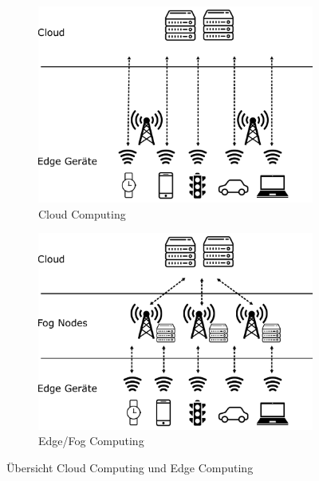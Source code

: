 \begin{figure}[htbp] %
	\centering
	\begin{subfigure}{0.45\textwidth} %
		\centering
		\includegraphics[width=\linewidth]{./content/graphics/cloud_computing.pdf} %
		\caption{Cloud Computing}
		\label{fig:subimg-a}
	\end{subfigure}
	\hfill %
	\begin{subfigure}{0.45\textwidth} %
		\centering
		\includegraphics[width=\linewidth]{./content/graphics/edge_computing.pdf} %
		\caption{Edge/Fog Computing}
		\label{fig:subimg-b}
	\end{subfigure}
	\caption{Übersicht Cloud Computing und Edge Computing}
	\label{fig:combined}
\end{figure}

